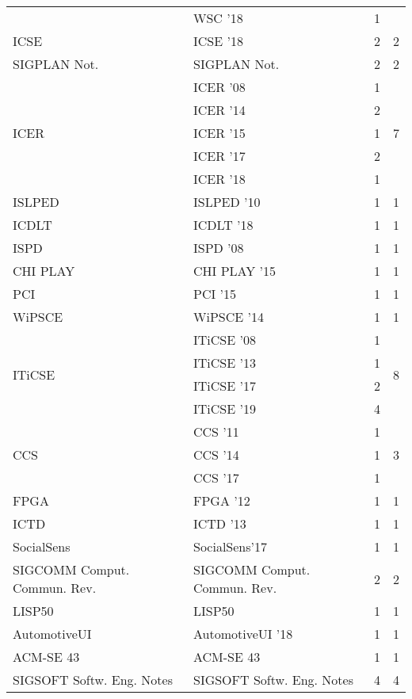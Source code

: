 \begin{table*}[t]
\begin{tabular}{llrr}
& WSC '18 & 1 &\\
\multirow{1}{*}{ICSE } & ICSE '18 & 2 & \multirow{1}{*}{2}\\
\multirow{1}{*}{SIGPLAN Not.} & SIGPLAN Not. & 2 & \multirow{1}{*}{2}\\
\multirow{5}{*}{ICER } & ICER '08 & 1 & \multirow{5}{*}{7}\\
& ICER '14 & 2 &\\
& ICER '15 & 1 &\\
& ICER '17 & 2 &\\
& ICER '18 & 1 &\\
\multirow{1}{*}{ISLPED } & ISLPED '10 & 1 & \multirow{1}{*}{1}\\
\multirow{1}{*}{ICDLT } & ICDLT '18 & 1 & \multirow{1}{*}{1}\\
\multirow{1}{*}{ISPD } & ISPD '08 & 1 & \multirow{1}{*}{1}\\
\multirow{1}{*}{CHI PLAY } & CHI PLAY '15 & 1 & \multirow{1}{*}{1}\\
\multirow{1}{*}{PCI } & PCI '15 & 1 & \multirow{1}{*}{1}\\
\multirow{1}{*}{WiPSCE } & WiPSCE '14 & 1 & \multirow{1}{*}{1}\\
\multirow{4}{*}{ITiCSE } & ITiCSE '08 & 1 & \multirow{4}{*}{8}\\
& ITiCSE '13 & 1 &\\
& ITiCSE '17 & 2 &\\
& ITiCSE '19 & 4 &\\
\multirow{3}{*}{CCS } & CCS '11 & 1 & \multirow{3}{*}{3}\\
& CCS '14 & 1 &\\
& CCS '17 & 1 &\\
\multirow{1}{*}{FPGA } & FPGA '12 & 1 & \multirow{1}{*}{1}\\
\multirow{1}{*}{ICTD } & ICTD '13 & 1 & \multirow{1}{*}{1}\\
\multirow{1}{*}{SocialSens} & SocialSens'17 & 1 & \multirow{1}{*}{1}\\
\multirow{1}{*}{SIGCOMM Comput. Commun. Rev.} & SIGCOMM Comput. Commun. Rev. & 2 & \multirow{1}{*}{2}\\
\multirow{1}{*}{LISP50} & LISP50 & 1 & \multirow{1}{*}{1}\\
\multirow{1}{*}{AutomotiveUI } & AutomotiveUI '18 & 1 & \multirow{1}{*}{1}\\
\multirow{1}{*}{ACM-SE 43} & ACM-SE 43 & 1 & \multirow{1}{*}{1}\\
\multirow{1}{*}{SIGSOFT Softw. Eng. Notes} & SIGSOFT Softw. Eng. Notes & 4 & \multirow{1}{*}{4}\\

\end{tabular}
\end{table*}
